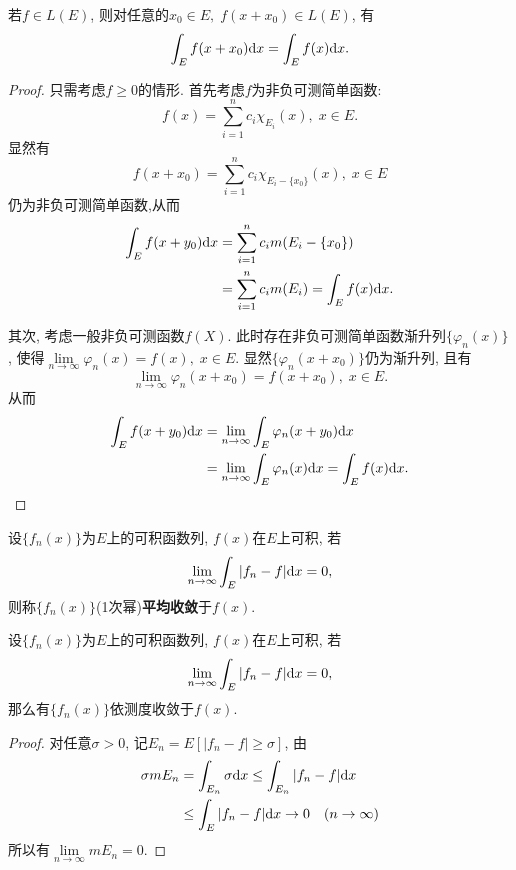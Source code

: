 \begin{theorem}[积分变量的平移变换定理]
	若$f \in L( E )$, 则对任意的$x_0 \in E, \; f(x+x_0) \in L( E )$, 有
	\begin{equation}
		\int_E f(x + x_0) \mathrm{d} x = \int_E f(x) \mathrm{d} x.
	\end{equation}
\end{theorem}
\begin{proof}
	只需考虑$f \geq 0$的情形. 
	首先考虑$f$为非负可测简单函数:
	$$
		f(x) = \sum\limits_{i=1}^n c_i \chi_{E_i}(x) , \; x\in E. 
	$$
	显然有
	$$
		f(x + x_0) = \sum\limits_{i=1}^n c_i \chi_{E_i - \{x_0\}}(x) , \; x\in E
	$$
	仍为非负可测简单函数,从而
	$$
	\begin{aligned}
		\int_E f(x + y_0) \mathrm{d} x &= 
		\sum\limits_{i=1}^n c_i m( E_i - \{x_0\} ) \\
		&= \sum\limits_{i=1}^n c_i m( E_i ) = \int_E f(x) \mathrm{d} x.
	\end{aligned}
	$$
	
	其次, 考虑一般非负可测函数$f(X)$. 
	此时存在非负可测简单函数渐升列$\{ \varphi_n (x) \}$, 使得$\lim\limits_{n \to \infty} \varphi_n (x) = f(x), \; x \in E$. 
	显然$\{ \varphi_n (x + x_0) \}$仍为渐升列, 且有
	$$
		\lim\limits_{n \to \infty} \varphi_n (x + x_0) = f(x + x_0), \; x \in E.
	$$
	从而
	$$
	\begin{aligned}
		\int_E f(x + y_0) \mathrm{d} x &= 
		\lim\limits_{n \to \infty} \int_E \varphi_n (x + y_0) \mathrm{d} x \\
		&= \lim\limits_{n \to \infty} \int_E \varphi_n (x)\mathrm{d} x = \int_E f(x) \mathrm{d} x.
	\end{aligned}
	$$
\end{proof}

\begin{definition}[平均收敛]
	设$\{ f_n(x) \}$为$E$上的可积函数列, $f(x)$在$E$上可积, 若
	$$
		\lim\limits_{n \to \infty} \int_E |f_n -f| \mathrm{d} x = 0,
	$$
	则称$\{ f_n(x) \}$(1次幂)\textbf{平均收敛}于$f(x)$.
\end{definition}

\begin{theorem}[平均收敛一定依测度收敛]
	设$\{ f_n(x) \}$为$E$上的可积函数列, $f(x)$在$E$上可积, 若
	$$
		\lim\limits_{n \to \infty} \int_E |f_n -f| \mathrm{d} x = 0,
	$$
	那么有$\{ f_n(x) \}$依测度收敛于$f(x)$. 
\end{theorem}

\begin{proof}
	\;
	对任意$\sigma > 0$, 记$E_n = E[|f_n - f| \geq \sigma]$, 由
	$$
	\begin{aligned}
		\sigma m E_n 
		&= \int_{E_n} \sigma \mathrm{d} x 
		\leq \int_{E_n} |f_n - f| \mathrm{d} x \\
		&\leq \int_E |f_n - f| \mathrm{d} x \to 0 \quad (n \to \infty)
	\end{aligned}
	$$
	所以有$\lim\limits_{n \to \infty} m E_n = 0$. 
\end{proof}


